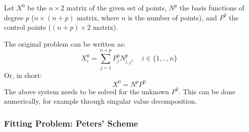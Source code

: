 Let $X^{0}$ be the $n \times 2$ matrix of the given set of points, $N^{p}$ the basis functions of degree $p$ ($n \times (n+p)$ matrix, where $n$ is the number of points), and $P^{0}$ the control points ($(n+p) \times 2$ matrix).

The original problem can be written as:
\begin{equation}
X_{i}^{0} = \sum\limits_{j=1}^{n+p} P_{j}^{0} N_{i,j}^{p}, \quad i \in \{1,..,n\}
\end{equation}
Or, in short:
\begin{equation}
X^{0} = N^{p} P^{0}
\end{equation}
The above system needs to be solved for the unknown $P^{0}$. This can be done numerically, for example through singular value decomposition. 

\subsubsection{Fitting Problem: Peters' Scheme}
